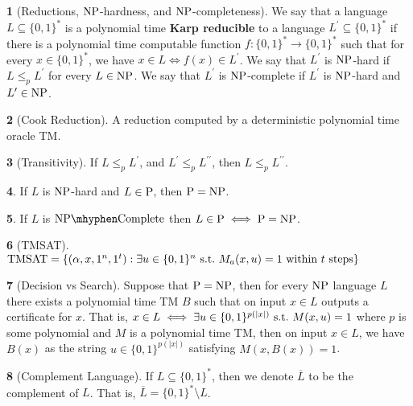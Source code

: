 \documentclass[10pt]{article}
\theoremstyle{definition}
\newtheorem{note}{}[section]
\begin{document}
\begin{note}[Reductions, $\mathrm{NP}$-hardness, and $\mathrm{NP}$-completeness]
  We say that a language $L \subseteq \{0, 1\}^\ast$ is a polynomial time
  \textbf{Karp reducible} to a language $L^\prime \subseteq \{0, 1\}^\ast$ if
  there is a polynomial time computable function
  $f : \{0, 1\}^\ast \to \{0, 1\}^\ast$ such that for
  every $x \in \{0, 1\}^\ast$, we have $x \in L \iff f(x) \in L^\prime$.
  We say that $L^\prime$ is $\mathrm{NP}$-hard if $L \leq_p L^\prime$ for every
  $L \in \mathrm{NP}$.
  We say that $L^\prime$ is $\mathrm{NP}$-complete if $L^\prime$ is $\mathrm{NP}$-hard and
  $L^\prime \in \mathrm{NP}$.
\end{note}

\begin{note}[Cook Reduction]
  A reduction computed by a deterministic polynomial time oracle TM.
\end{note}

\begin{note}[Transitivity]
  If $L \leq_p L^\prime$, and $L^\prime \leq_p L^{\prime \prime}$, then
  $L \leq_p L^{\prime \prime}$.
\end{note}

\begin{note}
  If $L$ is $\mathrm{NP}$-hard and $L \in \mathrm{P}$, then $\mathrm{P} = \mathrm{NP}$.
\end{note}

\begin{note}
  If $L$ is $\NPC$ then $L \in \mathrm{P} \iff \mathrm{P} = \mathrm{NP}$.
\end{note}

\begin{note}[TMSAT]
  $\mathrm{TMSAT} = \{ (\alpha, x, 1^n, 1^t) :
    \text{$\exists u \in \{0, 1\}^n \mathrm{\ s.t.\ }
          M_a (x, u) = 1$ within $t$ steps} \}$
\end{note}

\begin{note}[Decision vs Search]
  Suppose that $\mathrm{P} = \mathrm{NP}$, then for every $\mathrm{NP}$ language $L$ there exists
  a polynomial time TM $B$ such that on input $x \in L$ outputs a certificate
  for $x$.
  That is, $x \in L \iff \exists u \in \{ 0, 1\}^{p(|x|)} \mathrm{\ s.t.\ } M(x, u) = 1$
  where $p$ is some polynomial and $M$ is a polynomial time TM, then on
  input $x \in L$, we have $B(x)$ as the string $u \in \{0, 1\}^{p(|x|)}$
  satisfying $M(x, B(x)) = 1$.
\end{note}

\begin{note}[Complement Language]
  If $L \subseteq \{0, 1\}^\ast$, then we denote $\overline{L}$ to be the
  complement of $L$.
  That is, $\overline{L} = \{0, 1\}^\ast \setminus L$.
\end{note}
\end{document}
